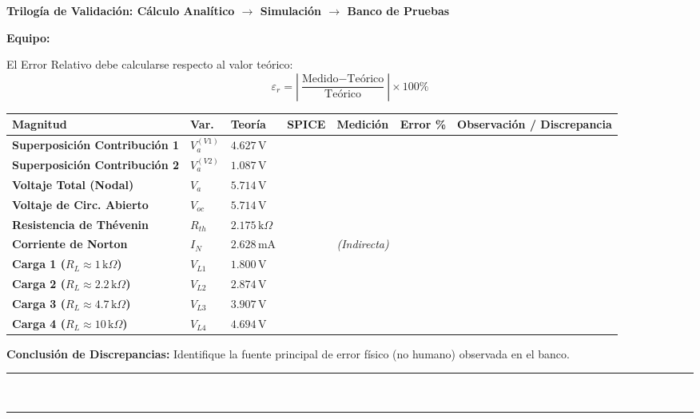 \documentclass[11pt, a4paper]{article}
\begin{document}
\begin{tcolorbox}[colback=ucbblue!5!white, colframe=ucbblue, title=\textbf{Hoja de Registro y Comparación de Evidencia}]
    \centering \textbf{Trilogía de Validación: Cálculo Analítico $\rightarrow$ Simulación $\rightarrow$ Banco de Pruebas}
\end{tcolorbox}

\textbf{Equipo:} \hrulefill 

\vspace{0.2cm}
\noindent El Error Relativo debe calcularse respecto al valor teórico: 
\begin{equation*}
    \varepsilon_r = \left| \frac{\text{Medido} - \text{Teórico}}{\text{Teórico}} \right| \times 100\%
\end{equation*}

\renewcommand{\arraystretch}{1.8}
\noindent
\begin{tabularx}{\textwidth}{|>{\bfseries\RaggedRight}p{2.5cm}|>{\centering\arraybackslash}p{1.2cm}|>{\RaggedRight\arraybackslash}X|>{\RaggedRight\arraybackslash}X|>{\RaggedRight\arraybackslash}X|>{\RaggedRight\arraybackslash}X|>{\RaggedRight\arraybackslash}p{2.5cm}|}
\hline
\rowcolor{ucbblue!10}
\textbf{Magnitud} & \textbf{Var.} & \textbf{Teoría} & \textbf{SPICE} & \textbf{Medición} & \textbf{Error \%} & \textbf{Observación / Discrepancia} \\ \hline
Superposición Contribución 1 & $V_{a}^{(V1)}$ & $4.627\,\text{V}$ & & & & \\ \hline
Superposición Contribución 2 & $V_{a}^{(V2)}$ & $1.087\,\text{V}$ & & & & \\ \hline
Voltaje Total \newline (Nodal) & $V_{a}$ & $5.714\,\text{V}$ & & & & \\ \hline
Voltaje de Circ. Abierto & $V_{oc}$ & $5.714\,\text{V}$ & & & & \\ \hline
Resistencia de Thévenin & $R_{th}$ & $2.175\,\text{k}\Omega$ & & & & \\ \hline
Corriente de Norton & $I_{N}$ & $2.628\,\text{mA}$ & & \textit{(Indirecta)} & & \\ \hline
Carga 1 \newline ($R_L \approx 1\,\text{k}\Omega$) & $V_{L1}$ & $1.800\,\text{V}$ & & & & \\ \hline
Carga 2 \newline ($R_L \approx 2.2\,\text{k}\Omega$) & $V_{L2}$ & $2.874\,\text{V}$ & & & & \\ \hline
Carga 3 \newline ($R_L \approx 4.7\,\text{k}\Omega$) & $V_{L3}$ & $3.907\,\text{V}$ & & & & \\ \hline
Carga 4 \newline ($R_L \approx 10\,\text{k}\Omega$) & $V_{L4}$ & $4.694\,\text{V}$ & & & & \\ \hline
\end{tabularx}

\vspace{0.5cm}
\textbf{Conclusión de Discrepancias:} Identifique la fuente principal de error físico (no humano) observada en el banco. \\
\rule{\textwidth}{0.4pt} \\
\rule{\textwidth}{0.4pt}
\end{document}
